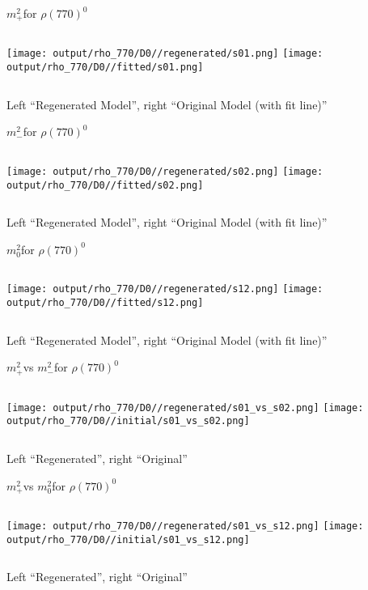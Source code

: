 \documentclass{beamer}
\newcommand{\MP}{\ensuremath{m^2_+}}
\newcommand{\MM}{\ensuremath{m^2_-}}
\newcommand{\MZ}{\ensuremath{m^2_0}}
\begin{document}
\begin{frame}{\MP for $\rho(770)^0$}
\begin{columns}[t]
\centering
\texttt{[image: output/rho\_770/D0//regenerated/s01.png]}
\centering
\texttt{[image: output/rho\_770/D0//fitted/s01.png]}
\end{columns}
    \centering
    Left ``Regenerated Model'', right ``Original Model (with fit line)''
\end{frame}                   

\begin{frame}{\MM for $\rho(770)^0$}
\begin{columns}[t]
\centering
\texttt{[image: output/rho\_770/D0//regenerated/s02.png]}
\centering
\texttt{[image: output/rho\_770/D0//fitted/s02.png]}
\end{columns}
    \centering
    Left ``Regenerated Model'', right ``Original Model (with fit line)''
\end{frame}                   

\begin{frame}{\MZ for $\rho(770)^0$}
\begin{columns}[t]
\centering
\texttt{[image: output/rho\_770/D0//regenerated/s12.png]}
\centering
\texttt{[image: output/rho\_770/D0//fitted/s12.png]}
\end{columns}
    \centering
    Left ``Regenerated Model'', right ``Original Model (with fit line)''
\end{frame}                   


\begin{frame}{\MP vs \MM for $\rho(770)^0$}
\begin{columns}[t]
\centering
\texttt{[image: output/rho\_770/D0//regenerated/s01\_vs\_s02.png]}
\centering
\texttt{[image: output/rho\_770/D0//initial/s01\_vs\_s02.png]}
\end{columns}
    \centering
    Left ``Regenerated'', right ``Original''
\end{frame} 


\begin{frame}{\MP vs \MZ for $\rho(770)^0$}
\begin{columns}[t]
\centering
\texttt{[image: output/rho\_770/D0//regenerated/s01\_vs\_s12.png]}
\centering
\texttt{[image: output/rho\_770/D0//initial/s01\_vs\_s12.png]}
\end{columns}
    \centering
    Left ``Regenerated'', right ``Original''
\end{frame} 
\end{document}
